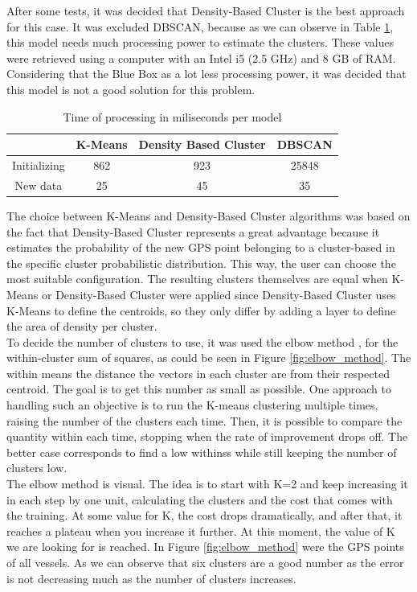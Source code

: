 After some tests, it was decided that Density-Based Cluster is the best approach for this case. It was excluded DBSCAN, because as we can observe in Table \ref{table:mill_per_moodle}, this model needs much processing power to estimate the clusters. These values were retrieved using a computer with an Intel i5 (2.5 GHz) and 8 GB of RAM. Considering that the Blue Box as a lot less processing power, it was decided that this model is not a good solution for this problem.
\\

\begin {table}[]
\begin{center}
\begin{tabular}{c|c|c|c}
& \textbf{K-Means} & \textbf{Density Based Cluster} & \textbf{DBSCAN} \\
\hline
Initializing & 862 & 923 & 25848 \\

New data & 25 & 45 & 35 
\label{table:mill_per_moodle}
\end{tabular}
\caption {Time of processing in miliseconds per model}
\end{center}
\end {table}

The choice between K-Means and Density-Based Cluster algorithms was based on the fact that Density-Based Cluster represents a great advantage because it estimates the probability of the new GPS point belonging to a cluster-based in the specific cluster probabilistic distribution. This way, the user can choose the most suitable configuration. The resulting clusters themselves are equal when K-Means or Density-Based Cluster were applied since Density-Based Cluster uses K-Means to define the centroids, so they only differ by adding a layer to define the area of density per cluster.
\\
To decide the number of clusters to use, it was used the elbow method \cite{Kodinariya2013ReviewOD}, for the within-cluster sum of squares, as could be seen in Figure \ref{fig:elbow_method}. The within means the distance the vectors in each cluster are from their respected centroid. The goal is to get this number as small as possible. One approach to handling such an objective is to run the K-means clustering multiple times, raising the number of the clusters each time. Then, it is possible to compare the quantity within each time, stopping when the rate of improvement drops off. The better case corresponds to find a low withinss while still keeping the number of clusters low.\\
The elbow method is visual. The idea is to start with K=2 and keep increasing it in each step by one unit, calculating the clusters and the cost that comes with the training. At some value for K, the cost drops dramatically, and after that, it reaches a plateau when you increase it further. At this moment, the value of K we are looking for is reached.
In Figure \ref{fig:elbow_method} were the GPS points of all vessels. As we can observe that six clusters are a good number as the error is not decreasing much as the number of clusters increases. 



